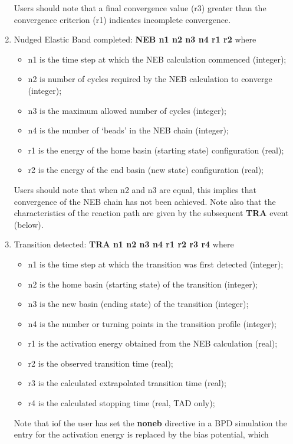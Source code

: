 \begin{enumerate}
\begin{itemize}
\end{itemize}
Users should note that a final convergence value (r3) greater than the
convergence criterion (r1) indicates incomplete convergence.
\item Nudged Elastic Band completed: {\bf NEB n1 n2 n3 n4 r1 r2} \newline
where
\begin{itemize}
\item n1 is the time step at which the NEB calculation commenced (integer);
\item n2 is number of cycles required by the NEB calculation to converge (integer);
\item n3 is the maximum allowed number of cycles (integer);
\item n4 is the number of `beads' in the NEB chain (integer);
\item r1 is the energy of the home basin (starting state) configuration (real);
\item r2 is the energy of the end basin (new state) configuration (real);
\end{itemize}
Users should note that when n2 and n3 are equal, this implies that
convergence of the NEB chain has not been achieved. Note also that the
characteristics of the reaction path are given by the subsequent {\bf
TRA} event (below).
\item Transition detected: {\bf TRA n1 n2 n3 n4 r1 r2 r3 r4} \newline
where
\begin{itemize}
\item n1 is the time step at which the transition was first detected (integer);
\item n2 is the home basin (starting state) of the transition (integer);
\item n3 is the new basin (ending state) of the transition (integer);
\item n4 is the number or turning points in the transition profile (integer);
\item r1 is the activation energy obtained from the NEB calculation (real);
\item r2 is the observed transition time (real);
\item r3 is the calculated extrapolated transition time (real);
\item r4 is the calculated stopping time (real, TAD only);
\end{itemize}
Note that iof the user has set the {\bf noneb} directive in a BPD simulation
the entry for the activation energy is replaced by the bias potential, which

\end{enumerate}
